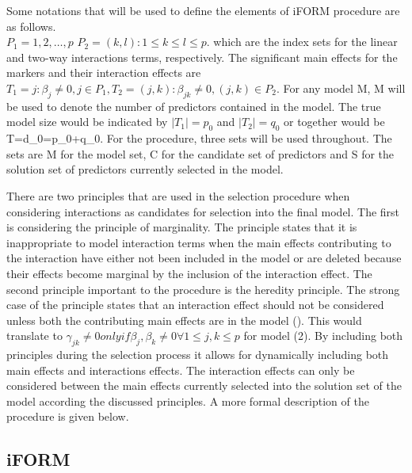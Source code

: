 \documentclass[11pt,]{book}
\theoremstyle{definition}
\theoremstyle{definition}
\theoremstyle{remark}
\begin{document}
Some notations that will be used to define the elements of
\cite{hao2014interaction} iFORM procedure are as follows.\\
\(P_1 = {1,2,…,p}\) \(P_2 = {(k,l):1 ≤ k ≤ l ≤ p}.\) which are the index
sets for the linear and two-way interactions terms, respectively. The
significant main effects for the markers and their interaction effects
are
\(T_1 = {j:\beta_j \ne 0,j\in P_1},T_2 = {(j,k):\beta_{jk} \ne 0,(j,k) \in P_2 }.\)
For any model M, \textbar{}M\textbar{} will be used to denote the number
of predictors contained in the model. The true model size would be
indicated by \(|T_1| = p_0\) and \(|T_2| = q_0\) or together would be
\textbar{}T\textbar{}=d\_0=p\_0+q\_0. For the procedure, three sets will
be used throughout. The sets are M for the model set, C for the
candidate set of predictors and S for the solution set of predictors
currently selected in the model.

There are two principles that are used in the selection procedure when
considering interactions as candidates for selection into the final
model. The first is considering the principle of marginality. The
principle states that it is inappropriate to model interaction terms
when the main effects contributing to the interaction have either not
been included in the model or are deleted because their effects become
marginal by the inclusion of the interaction effect. The second
principle important to the procedure is the heredity principle. The
strong case of the principle states that an interaction effect should
not be considered unless both the contributing main effects are in the
model (\cite{zhao2006model}). This would translate to
\(\gamma_{jk} ≠ 0 only if \beta_j, \beta_k \ne 0 \forall 1 ≤ j, k ≤ p\)
for model (2). By including both principles during the selection process
it allows for dynamically including both main effects and interactions
effects. The interaction effects can only be considered between the main
effects currently selected into the solution set of the model according
the discussed principles. A more formal description of the procedure is
given below.

\subsection{iFORM}\label{iform}
\end{document}
